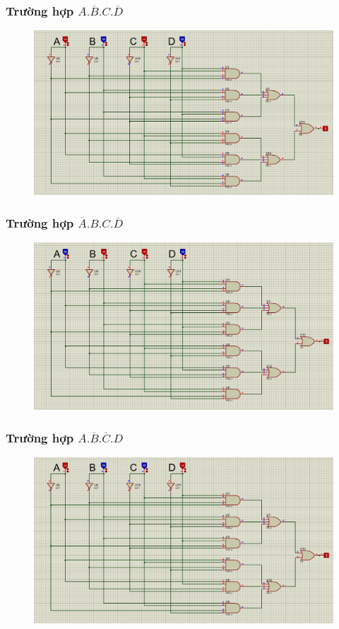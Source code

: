 \subsubsection{Trường hợp $A.\overline{B}.C.\overline{D}$}
\begin{figure}[H]
    \centering
    \includegraphics[width=\textwidth]{pictures/b2.3.png}
\end{figure}
\subsubsection{Trường hợp $\overline{A}.B.C.\overline{D}$}
\begin{figure}[H]
    \centering
    \includegraphics[width=\textwidth]{pictures/b2.6.png}
\end{figure}
\subsubsection{Trường hợp $A.\overline{B}.\overline{C}.D$}
\begin{figure}[H]
    \centering
    \includegraphics[width=\textwidth]{pictures/b2.5.png}
\end{figure}
\cleardoublepage